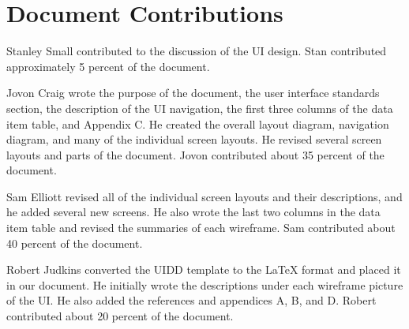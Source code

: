 \documentclass{article}
\begin{document}
\newpage
\section{Document Contributions}

Stanley Small contributed to the discussion of the UI design. Stan contributed approximately 5 percent of the document.

Jovon Craig wrote the purpose of the document, the user interface standards section, the description of the UI navigation, the first three columns of the data item table, and Appendix C. He created the overall layout diagram, navigation diagram, and many of the individual screen layouts. He revised several screen layouts and parts of the document. Jovon contributed about 35 percent of the document.

Sam Elliott revised all of the individual screen layouts and their descriptions, and he added several new screens. He also wrote the last two columns in the data item table and revised the summaries of each wireframe. Sam contributed about 40 percent of the document.

Robert Judkins converted the UIDD template to the LaTeX format and placed it in our document. He initially wrote the descriptions under each wireframe picture of the UI. He also added the references and appendices A, B, and D. Robert contributed about 20 percent of the document.

\newpage




\newpage



\end{document}
